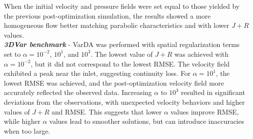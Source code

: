 When the initial velocity and pressure fields were set equal to those yielded by the previous post-optimization simulation, the results showed a more homogeneous flow better matching parabolic characteristics and with lower \(J + R\) values.\\

\textbf{\textit{3DVar benchmark}} - VarDA was performed with spatial regularization terms set to $\alpha = 10^{-2}$, $10^1$, and $10^3$. The lowest value of $J + R$ was achieved with $\alpha = 10^{-2}$, but it did not correspond to the lowest RMSE. The velocity field exhibited a peak near the inlet, suggesting continuity loss. For $\alpha = 10^1$, the lowest RMSE was achieved, and the post-optimization velocity field more accurately reflected the observed data. Increasing $\alpha$ to $10^3$ resulted in significant deviations from the observations, with unexpected velocity behaviors and higher values of $J + R$ and RMSE. This suggests that lower $\alpha$ values improve RMSE, while higher $\alpha$ values lead to smoother solutions, but can introduce inaccuracies when too large.\\


